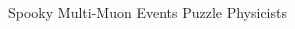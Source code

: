 \begin{MyArticle}[enhanced, tikz={rotate=0},
  borderline={1mm}{0mm}{dotted}, width=1.0\textwidth]{Spooky Multi-Muon Events Puzzle Physicists}
\begin{multicols}{2}
  \end{multicols}
  
\end{MyArticle}
